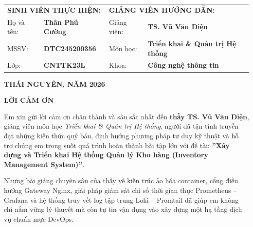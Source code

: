 \documentclass[12pt,a4paper,oneside]{report}
\begin{document}
\begin{titlepage}
\begin{center}
    \vspace*{\fill}
    \begin{tcolorbox}[
        enhanced,
        colback=white,
        colframe=codeborder,
        arc=3mm,
        width=0.92\linewidth,
        boxrule=1pt
    ]
    \renewcommand{\arraystretch}{1.35}
    \begin{tabularx}{\linewidth}{lX lX}
        \multicolumn{2}{l}{\textbf{\color{primaryblue}SINH VIÊN THỰC HIỆN:}} & \multicolumn{2}{l}{\textbf{\color{primaryblue}GIẢNG VIÊN HƯỚNG DẪN:}} \\
        Họ và tên: & \textbf{Thân Phú Cường} & Giảng viên: & \textbf{TS. Vũ Văn Diện} \\
        MSSV: & \textbf{DTC245200356} & Môn học: & \textbf{Triển khai \& Quản trị Hệ thống} \\
        Lớp: & \textbf{CNTTK23L} & Khoa: & \textbf{Công nghệ thông tin} \\
    \end{tabularx}
    \end{tcolorbox}
    \vspace*{\fill}

    {\fontsize{12pt}{15pt}\selectfont \textbf{THÁI NGUYÊN, NĂM 2026}}
\end{center}
\end{titlepage}

\newpage
{}
\setcounter{page}{1}

\begin{center}
    {\fontsize{16pt}{20pt}\selectfont \textbf{\color{primaryblue}LỜI CẢM ƠN}}
\end{center}
\vspace{10pt}

Em xin gửi lời cảm ơn chân thành và sâu sắc nhất đến \textbf{thầy TS. Vũ Văn Diện}, giảng viên môn học \textit{Triển khai \& Quản trị Hệ thống}, người đã tận tình truyền đạt những kiến thức quý báu, định hướng phương pháp tư duy kỹ thuật và hỗ trợ chúng em trong suốt quá trình hoàn thành bài tập lớn với đề tài: \textbf{''Xây dựng và Triển khai Hệ thống Quản lý Kho hàng (Inventory Management System)''}.

Những bài giảng chuyên sâu của thầy về kiến trúc ảo hóa container, cổng điều hướng Gateway Nginx, giải pháp giám sát chỉ số thời gian thực Prometheus -- Grafana và hệ thống truy vết log tập trung Loki -- Promtail đã giúp em không chỉ nắm vững lý thuyết mà còn tự tin vận dụng vào xây dựng một hạ tầng dịch vụ chuẩn mực DevOps.
\end{document}
